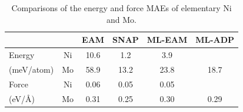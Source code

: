 \documentclass[prb,reprint,superscriptaddress]{revtex4-2}
\begin{document}
% 
%
\begin{table}
\centering
\begin{tabular}{lccccc}
\hline
            &    & EAM\cite{ZJW2} & SNAP\cite{SNAP} & ML-EAM & ML-ADP \\
\hline
Energy     & Ni & 10.6           & 1.2             & 3.9    &        \\
(meV/atom) & Mo & 58.9           & 13.2            & 23.8   & 18.7   \\
\hline
Force      & Ni & 0.06           & 0.05            & 0.05   &        \\
(eV/\AA)   & Mo & 0.31           & 0.25            & 0.30   & 0.29   \\
\hline
\end{tabular}
\caption{\label{table:Mo_Ni_mae} Comparisons of the energy and force MAEs of 
elementary Ni and Mo. 
}
\end{table}
\end{document}
